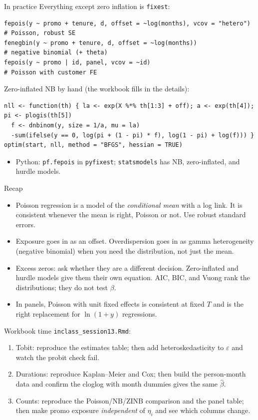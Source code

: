 \documentclass[aspectratio=169,11pt]{beamer}
\begin{document}
\begin{frame}[fragile]{In practice}
Everything except zero inflation is \texttt{fixest}:
\begin{lstlisting}
fepois(y ~ promo + tenure, d, offset = ~log(months), vcov = "hetero")    # Poisson, robust SE
fenegbin(y ~ promo + tenure, d, offset = ~log(months))                    # negative binomial (+ theta)
fepois(y ~ promo | id, panel, vcov = ~id)                                 # Poisson with customer FE
\end{lstlisting}
Zero-inflated NB by hand (the workbook fills in the details):
\begin{lstlisting}
nll <- function(th) { la <- exp(X %*% th[1:3] + off); a <- exp(th[4]); pi <- plogis(th[5])
  f <- dnbinom(y, size = 1/a, mu = la)
  -sum(ifelse(y == 0, log(pi + (1 - pi) * f), log(1 - pi) + log(f))) }
optim(start, nll, method = "BFGS", hessian = TRUE)
\end{lstlisting}
\begin{itemize}
	\item Python: \texttt{pf.fepois} in \texttt{pyfixest}; \texttt{statsmodels} has NB, zero-inflated, and hurdle models.
\end{itemize}
\end{frame}


\begin{frame}{Recap}
\begin{itemize}
	\item Poisson regression is a model of the \emph{conditional mean} with a log link. It is consistent
	whenever the mean is right, Poisson or not. Use robust standard errors.
	\medskip
	\item Exposure goes in as an offset. Overdispersion goes in as gamma heterogeneity (negative binomial)
	when you need the distribution, not just the mean.
	\medskip
	\item Excess zeros: ask whether they are a different decision. Zero-inflated and hurdle models give them
	their own equation. AIC, BIC, and Vuong rank the distributions; they do not test $\beta$.
	\medskip
	\item In panels, Poisson with unit fixed effects is consistent at fixed $T$ and is the right replacement
	for $\ln(1+y)$ regressions.
\end{itemize}
\end{frame}


\begin{frame}{Workbook time}
\texttt{inclass\_session13.Rmd}:
\begin{enumerate}
	\item Tobit: reproduce the estimates table; then add heteroskedasticity to $\varepsilon$ and watch the
	probit check fail.
	\item Durations: reproduce Kaplan--Meier and Cox; then build the person-month data and confirm the
	cloglog with month dummies gives the same $\hat\beta$.
	\item Counts: reproduce the Poisson/NB/ZINB comparison and the panel table; then make promo exposure
	\emph{independent} of $\eta_i$ and see which columns change.
\end{enumerate}
\end{frame}
\end{document}
